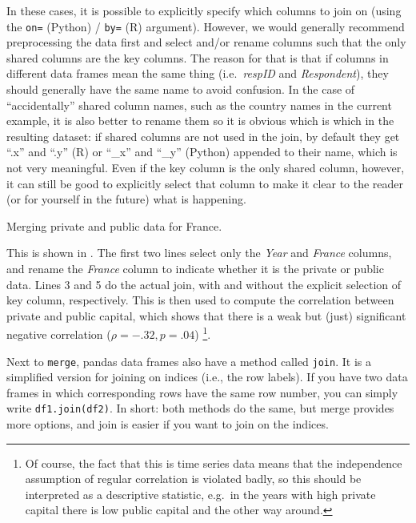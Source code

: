 In these cases, it is possible to explicitly specify which columns to join on (using the \verb+on=+ (Python) / \verb+by=+ (R) argument).
However, we would generally recommend preprocessing the data first and select and/or rename columns such that the only shared columns are the key columns.
The reason for that is that if columns in different data frames mean the same thing (i.e.\ \emph{respID} and \emph{Respondent}), they should generally have the same name to avoid confusion.
In the case of ``accidentally'' shared column names, such as the country names in the current example,
it is also better to rename them so it is obvious which is which in the resulting dataset:
if shared columns are not used in the join, by default they get ``.x'' and ``.y'' (R) or ``\_x'' and ``\_y'' (Python) appended to their name, which is not very meaningful.
Even if the key column is the only shared column, however, it can still be good to explicitly select that column to make it clear to the reader (or for yourself in the future) what is happening.

\begin{ccsexample}
\caption{Merging private and public data for France.}\label{ex:merge}
\end{ccsexample}

This is shown in .
The first two lines select only the \emph{Year} and \emph{France} columns, and rename the \emph{France} column to indicate whether it is the private or public data.
Lines 3 and 5 do the actual join, with and without the explicit selection of key column, respectively.
This is then used to compute the correlation between private and public capital,
which shows that there is a weak but (just) significant negative correlation ($\rho=-.32, p=.04$)%
\footnote{Of course, the fact that this is time series data means that the independence assumption of regular correlation is violated badly, so this should be interpreted as a descriptive statistic, e.g.\ in the years with high private capital there is low public capital and the other way around.}.

\begin{feature}
  Next to \texttt{merge}, pandas data frames also have a method called \texttt{join}. It is a simplified version for joining on indices (i.e., the row labels). If you have two data frames in which corresponding rows have the same row number, you can simply write \texttt{df1.join(df2)}. In short: both methods do the same, but merge provides more options, and join is easier if you want to join on the indices.
\end{feature}



